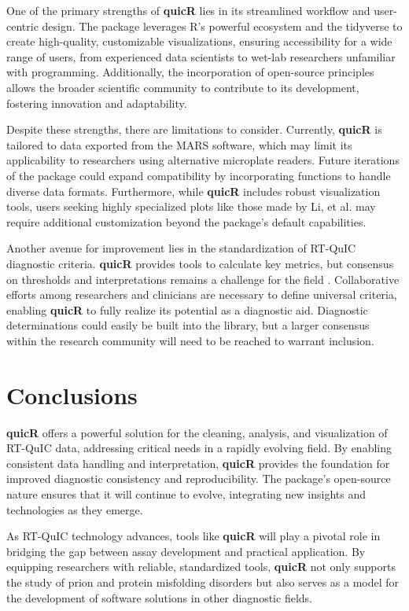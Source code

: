 \documentclass[preprint,12pt,a4paper]{elsarticle}
\begin{document}
        One of the primary strengths of \textbf{quicR} lies in its streamlined workflow and user-centric design. The package leverages R’s powerful ecosystem and the tidyverse to create high-quality, customizable visualizations, ensuring accessibility for a wide range of users, from experienced data scientists to wet-lab researchers unfamiliar with programming. Additionally, the incorporation of open-source principles allows the broader scientific community to contribute to its development, fostering innovation and adaptability.

        Despite these strengths, there are limitations to consider. Currently, \textbf{quicR} is tailored to data exported from the MARS software, which may limit its applicability to researchers using alternative microplate readers. Future iterations of the package could expand compatibility by incorporating functions to handle diverse data formats. Furthermore, while \textbf{quicR} includes robust visualization tools, users seeking highly specialized plots like those made by Li, et al.\cite{Li2025} may require additional customization beyond the package’s default capabilities.

        Another avenue for improvement lies in the standardization of RT-QuIC diagnostic criteria. \textbf{quicR} provides tools to calculate key metrics, but consensus on thresholds and interpretations remains a challenge for the field \cite{Rowden2023}. Collaborative efforts among researchers and clinicians are necessary to define universal criteria, enabling \textbf{quicR} to fully realize its potential as a diagnostic aid. Diagnostic determinations could easily be built into the library, but a larger consensus within the research community will need to be reached to warrant inclusion.

    \section{Conclusions}
        \textbf{quicR} offers a powerful solution for the cleaning, analysis, and visualization of RT-QuIC data, addressing critical needs in a rapidly evolving field. By enabling consistent data handling and interpretation, \textbf{quicR} provides the foundation for improved diagnostic consistency and reproducibility. The package's open-source nature ensures that it will continue to evolve, integrating new insights and technologies as they emerge.

        As RT-QuIC technology advances, tools like \textbf{quicR} will play a pivotal role in bridging the gap between assay development and practical application. By equipping researchers with reliable, standardized tools, \textbf{quicR} not only supports the study of prion and protein misfolding disorders but also serves as a model for the development of software solutions in other diagnostic fields.
\end{document}
